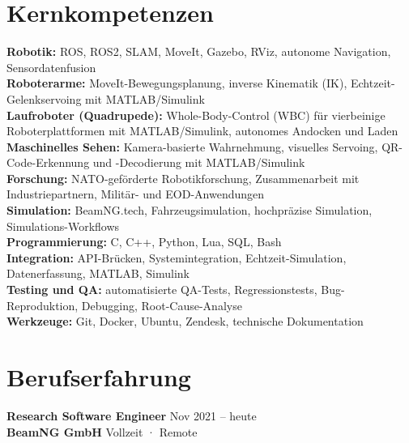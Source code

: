 \documentclass[11pt,a4paper]{article}
\begin{document}
\section*{Kernkompetenzen}

{\small
\textbf{\color{PrimaryColor}Robotik:} ROS, ROS2, SLAM, MoveIt, Gazebo, RViz, autonome Navigation, Sensordatenfusion\\
\textbf{\color{PrimaryColor}Roboterarme:} MoveIt-Bewegungsplanung, inverse Kinematik (IK), Echtzeit-Gelenkservoing mit MATLAB/Simulink\\
\textbf{\color{PrimaryColor}Laufroboter (Quadrupede):} Whole-Body-Control (WBC) für vierbeinige Roboterplattformen mit MATLAB/Simulink, autonomes Andocken und Laden\\
\textbf{\color{PrimaryColor}Maschinelles Sehen:} Kamera-basierte Wahrnehmung, visuelles Servoing, QR-Code-Erkennung und -Decodierung mit MATLAB/Simulink\\
\textbf{\color{PrimaryColor}Forschung:} NATO-geförderte Robotikforschung, Zusammenarbeit mit Industriepartnern, Militär- und EOD-Anwendungen\\
\textbf{\color{PrimaryColor}Simulation:} BeamNG.tech, Fahrzeugsimulation, hochpräzise Simulation, Simulations-Workflows\\
\textbf{\color{PrimaryColor}Programmierung:} C, C++, Python, Lua, SQL, Bash\\
\textbf{\color{PrimaryColor}Integration:} API-Brücken, Systemintegration, Echtzeit-Simulation, Datenerfassung, MATLAB, Simulink\\
\textbf{\color{PrimaryColor}Testing und QA:} automatisierte QA-Tests, Regressionstests, Bug-Reproduktion, Debugging, Root-Cause-Analyse\\
\textbf{\color{PrimaryColor}Werkzeuge:} Git, Docker, Ubuntu, Zendesk, technische Dokumentation
}

\section*{Berufserfahrung}

\textbf{\color{PrimaryColor}Research Software Engineer} \hfill Nov 2021 -- heute\\
\textbf{BeamNG GmbH} \hfill Vollzeit · Remote
\end{document}

